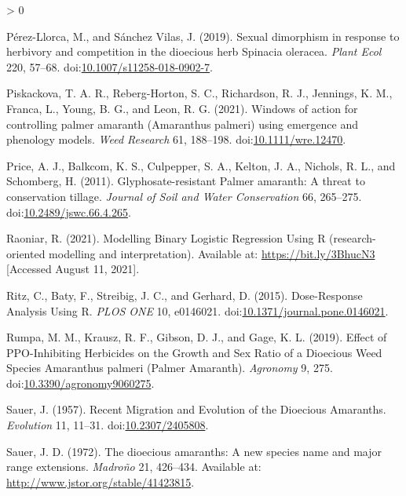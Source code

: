 \documentclass[utf8]{frontiersSCNS}
\newlength{\cslhangindent}
\newenvironment{CSLReferences}[2] %
 {%
  \setlength{\parindent}{0pt}
  \ifodd #1 \everypar{\setlength{\hangindent}{\cslhangindent}}\ignorespaces\fi
  \ifnum #2 > 0
  \setlength{\parskip}{#2\baselineskip}
  \fi
 }%
 {}
\begin{document}
\begin{CSLReferences}{1}{0}
\leavevmode\hypertarget{ref-perez-llorca2019}{}%
Pérez-Llorca, M., and Sánchez Vilas, J. (2019). Sexual dimorphism in
response to herbivory and competition in the dioecious herb {Spinacia}
oleracea. \emph{Plant Ecol} 220, 57--68.
doi:\href{https://doi.org/10.1007/s11258-018-0902-7}{10.1007/s11258-018-0902-7}.

\leavevmode\hypertarget{ref-piskackova2021}{}%
Piskackova, T. A. R., Reberg-Horton, S. C., Richardson, R. J., Jennings,
K. M., Franca, L., Young, B. G., and Leon, R. G. (2021). Windows of
action for controlling palmer amaranth ({Amaranthus} palmeri) using
emergence and phenology models. \emph{Weed Research} 61, 188--198.
doi:\href{https://doi.org/10.1111/wre.12470}{10.1111/wre.12470}.

\leavevmode\hypertarget{ref-price2011}{}%
Price, A. J., Balkcom, K. S., Culpepper, S. A., Kelton, J. A., Nichols,
R. L., and Schomberg, H. (2011). Glyphosate-resistant {Palmer} amaranth:
{A} threat to conservation tillage. \emph{Journal of Soil and Water
Conservation} 66, 265--275.
doi:\href{https://doi.org/10.2489/jswc.66.4.265}{10.2489/jswc.66.4.265}.

\leavevmode\hypertarget{ref-raoniar2021}{}%
Raoniar, R. (2021). Modelling {Binary Logistic Regression Using R}
(research-oriented modelling and interpretation). Available at:
\url{https://bit.ly/3BhucN3} {[}Accessed August 11, 2021{]}.

\leavevmode\hypertarget{ref-ritz2015}{}%
Ritz, C., Baty, F., Streibig, J. C., and Gerhard, D. (2015).
Dose-{Response Analysis Using R}. \emph{PLOS ONE} 10, e0146021.
doi:\href{https://doi.org/10.1371/journal.pone.0146021}{10.1371/journal.pone.0146021}.

\leavevmode\hypertarget{ref-rumpa2019}{}%
Rumpa, M. M., Krausz, R. F., Gibson, D. J., and Gage, K. L. (2019).
Effect of {PPO}-{Inhibiting Herbicides} on the {Growth} and {Sex Ratio}
of a {Dioecious Weed Species Amaranthus} palmeri ({Palmer Amaranth}).
\emph{Agronomy} 9, 275.
doi:\href{https://doi.org/10.3390/agronomy9060275}{10.3390/agronomy9060275}.

\leavevmode\hypertarget{ref-sauer1957}{}%
Sauer, J. (1957). Recent {Migration} and {Evolution} of the {Dioecious
Amaranths}. \emph{Evolution} 11, 11--31.
doi:\href{https://doi.org/10.2307/2405808}{10.2307/2405808}.

\leavevmode\hypertarget{ref-sauer1972}{}%
Sauer, J. D. (1972). The dioecious amaranths: A new species name and
major range extensions. \emph{Madroño} 21, 426--434. Available at:
\url{http://www.jstor.org/stable/41423815}.


\end{CSLReferences}
\end{document}
